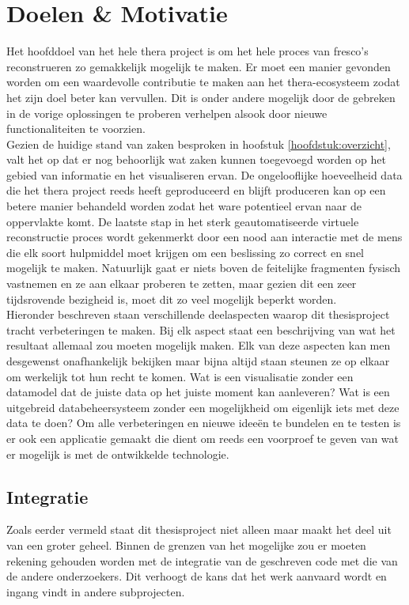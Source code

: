 \chapter{Doelen \& Motivatie}
\label{hoofdstuk:doelen}

Het hoofddoel van het hele thera project is om het hele proces van fresco's reconstrueren zo gemakkelijk mogelijk te maken. Er moet een manier gevonden worden om een waardevolle contributie te maken aan het thera-ecosysteem zodat het zijn doel beter kan vervullen. Dit is onder andere mogelijk door de gebreken in de vorige oplossingen te proberen verhelpen alsook door nieuwe functionaliteiten te voorzien.\\

Gezien de huidige stand van zaken besproken in hoofstuk \ref{hoofdstuk:overzicht}, valt het op dat er nog behoorlijk wat zaken kunnen toegevoegd worden op het gebied van informatie en het visualiseren ervan. De ongelooflijke hoeveelheid data die het thera project reeds heeft geproduceerd en blijft produceren kan op een betere manier behandeld worden zodat het ware potentieel ervan naar de oppervlakte komt. De laatste stap in het sterk geautomatiseerde virtuele reconstructie proces wordt gekenmerkt door een nood aan interactie met de mens die elk soort hulpmiddel moet krijgen om een beslissing zo correct en snel mogelijk te maken. Natuurlijk gaat er niets boven de feitelijke fragmenten fysisch vastnemen en ze aan elkaar proberen te zetten, maar gezien dit een zeer tijdsrovende bezigheid is, moet dit zo veel mogelijk beperkt worden.\\

Hieronder beschreven staan verschillende deelaspecten waarop dit thesisproject tracht verbeteringen te maken. Bij elk aspect staat een beschrijving van wat het resultaat allemaal zou moeten mogelijk maken. Elk van deze aspecten kan men desgewenst onafhankelijk bekijken maar bijna altijd staan steunen ze op elkaar om werkelijk tot hun recht te komen. Wat is een visualisatie zonder een datamodel dat de juiste data op het juiste moment kan aanleveren? Wat is een uitgebreid databeheersysteem zonder een mogelijkheid om eigenlijk iets met deze data te doen? Om alle verbeteringen en nieuwe idee\"en te bundelen en te testen is er ook een applicatie gemaakt die dient om reeds een voorproef te geven van wat er mogelijk is met de ontwikkelde technologie.  

\section{Integratie}
Zoals eerder vermeld staat dit thesisproject niet alleen maar maakt het deel uit van een groter geheel. Binnen de grenzen van het mogelijke zou er moeten rekening gehouden worden met de integratie van de geschreven code met die van de andere onderzoekers. Dit verhoogt de kans dat het werk aanvaard wordt en ingang vindt in andere subprojecten. 

